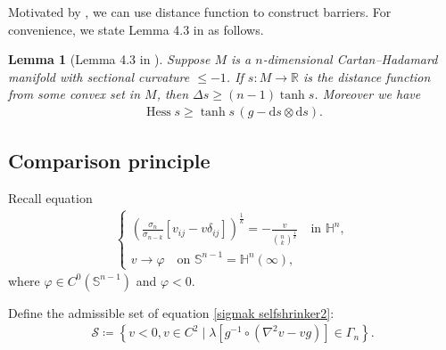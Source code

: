 \documentclass[reqno]{amsart}
\newtheorem{lemma}[theorem]{Lemma}
\theoremstyle{remark}
\theoremstyle{definition}
\numberwithin{equation}{section}
\begin{document}
Motivated by \cite{Choi}, we can use distance function to construct barriers. For convenience, we state Lemma 4.3 in \cite{Choi} as follows.
\begin{lemma}[Lemma 4.3 in \cite{Choi}]\label{Hessian of distance function}
    Suppose $M$ is a $n$-dimensional Cartan--Hadamard manifold with sectional curvature $\leqslant -1$. If $s : M \rightarrow \mathbb{R}$ is the distance function from some convex set in $M$, then $\Delta s \geqslant (n-1) \tanh s$. Moreover we have
    \[
    \begin{aligned}
            \operatorname{Hess} s \geqslant \tanh s \, (g - \mathrm{d}s \otimes \mathrm{d}s). 
    \end{aligned}
    \]
\end{lemma}


\subsection{Comparison principle}

Recall equation
\begin{align}
  \begin{cases}
      \left( \frac{\sigma_n}{\sigma_{n-k}} \left[v_{ij}-v\delta_{ij}\right] \right)^{\frac{1}{k}} = -\frac{v}{\binom{n}{k}^{\frac{1}{k}}} \quad \text{in } \mathbb{H}^{n}, \\
      v \rightarrow \varphi \quad \text{on } \mathbb{S}^{n-1}=\mathbb{H}^{n}(\infty), \label{sigmak selfshrinker2}
  \end{cases}
\end{align}
where $\varphi \in C^0(\mathbb{S}^{n-1})$ and $\varphi<0$.


Define the admissible set of equation \eqref{sigmak selfshrinker2}:
\begin{align}\label{admissible set}
    \mathcal{S} \coloneqq \left\{ v < 0, v \in C^{2} \mid \lambda \left[ g^{-1} \circ (\nabla^2 v - v g) \right] \in \Gamma_n \right\}.
\end{align}
\end{document}
